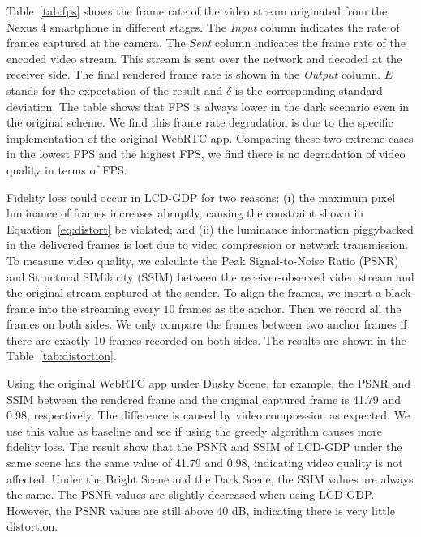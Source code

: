 Table~\ref{tab:fps} shows the frame rate of the video stream originated from the Nexus 4 smartphone 
in different stages. The {\it Input} column indicates the rate of frames captured at the camera. 
The {\it Sent} column indicates the frame rate of the encoded video stream.
This stream is sent over the network and decoded at the receiver side.
The final rendered frame rate is shown in the {\it Output} column. 
$E$ stands for the
expectation of the result and $\delta$ is the corresponding standard
deviation. The table shows that FPS is always lower in the dark scenario
even in the original scheme. We find this frame rate degradation
is due to the specific implementation of the original WebRTC app. Comparing these two
extreme cases in the lowest FPS and the highest FPS,  we find there is no degradation of video quality in terms of FPS.

Fidelity loss could occur in LCD-GDP for two reasons: (i) the maximum pixel luminance of 
frames increases abruptly, causing the constraint shown in Equation~\ref{eq:distort} be violated;
and (ii) the luminance information piggybacked in the delivered frames is lost due to video
compression or network transmission.
To measure video quality, we calculate the Peak
Signal-to-Noise Ratio (PSNR) and Structural SIMilarity (SSIM) 
between the receiver-observed video stream and the original stream captured at the sender. 
To align the frames, we insert a black frame into the streaming every $10$ 
frames as the anchor. Then we record all the frames on both sides. 
We only compare the frames between two anchor frames if there 
are exactly $10$ frames recorded on both sides. 
The results are shown in the Table~\ref{tab:distortion}.

Using the original WebRTC app under Dusky Scene, for example, the PSNR and SSIM between 
the rendered frame and the original captured frame is 41.79 and 0.98, respectively. 
The difference is caused by video compression as expected. We use this value as baseline
and see if using the greedy algorithm causes more fidelity loss. 
The result show that the PSNR and SSIM of LCD-GDP under the same scene has the same
value of 41.79 and 0.98, indicating video quality is not affected.
Under the Bright Scene and the Dark Scene, the SSIM values are always the same. 
The PSNR values are slightly decreased when using LCD-GDP.
However, the PSNR values are still above 40 dB, indicating there is very little distortion.


